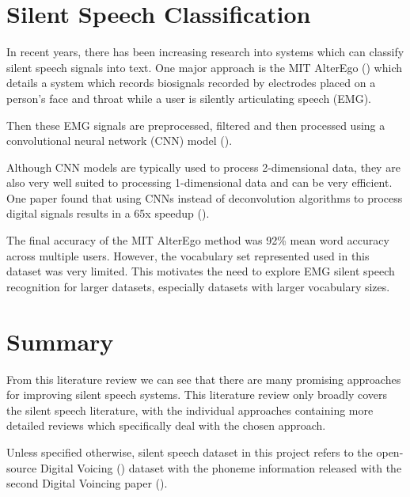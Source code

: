 \section{Silent Speech Classification}

In recent years, there has been increasing research into systems
which can classify silent speech signals into text. One major approach
is the MIT AlterEgo (\cite{alter_ego}) which details a system which 
records biosignals recorded by electrodes placed on a person's face and
throat while a user is silently articulating speech (EMG).

Then these EMG signals are preprocessed, filtered and then processed
using a convolutional neural network (CNN) model (\cite{cnn_def}).

Although CNN models are typically used
to process 2-dimensional data, they are also very well suited
to processing 1-dimensional data and can be very efficient. One
paper found that using CNNs instead of deconvolution algorithms
to process digital signals results in a 65x speedup (\cite{cnn_dsp}).

The final accuracy of the MIT AlterEgo method 
was 92\% mean word accuracy across multiple
users. However, the vocabulary set represented used in this dataset
was very limited. This motivates the need to explore
EMG silent speech recognition for larger datasets, especially datasets
with larger vocabulary sizes.

\section{Summary}

From this literature review we can see that there are many promising approaches
for improving silent speech systems. This literature review only broadly
covers the silent speech literature, with the individual approaches containing
more detailed reviews which specifically deal with the chosen approach.

Unless specified otherwise, silent speech dataset in this project
refers to the open-source Digital Voicing (\cite{gaddy2020digital})
dataset with the phoneme information
released with the second Digital Voincing paper (\cite{gaddy2021improved}).